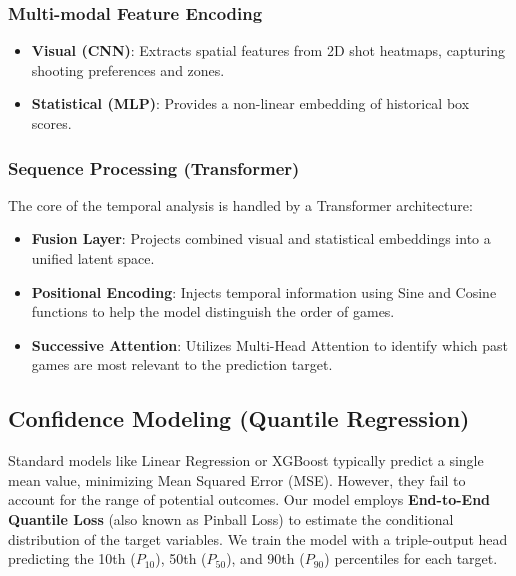 \documentclass[conference]{IEEEtran}
\begin{document}
\subsubsection{Multi-modal Feature Encoding}
\begin{itemize}
    \item \textbf{Visual (CNN)}: Extracts spatial features from 2D shot heatmaps, capturing shooting preferences and zones.
    \item \textbf{Statistical (MLP)}: Provides a non-linear embedding of historical box scores.
\end{itemize}

\subsubsection{Sequence Processing (Transformer)}
The core of the temporal analysis is handled by a Transformer architecture:
\begin{itemize}
    \item \textbf{Fusion Layer}: Projects combined visual and statistical embeddings into a unified latent space.
    \item \textbf{Positional Encoding}: Injects temporal information using Sine and Cosine functions to help the model distinguish the order of games.
    \item \textbf{Successive Attention}: Utilizes Multi-Head Attention to identify which past games are most relevant to the prediction target.
\end{itemize}

\subsection{Confidence Modeling (Quantile Regression)}
Standard models like Linear Regression or XGBoost typically predict a single mean value, minimizing Mean Squared Error (MSE). However, they fail to account for the range of potential outcomes.
Our model employs \textbf{End-to-End Quantile Loss} (also known as Pinball Loss) to estimate the conditional distribution of the target variables. We train the model with a triple-output head predicting the 10th ($P_{10}$), 50th ($P_{50}$), and 90th ($P_{90}$) percentiles for each target.
\end{document}
